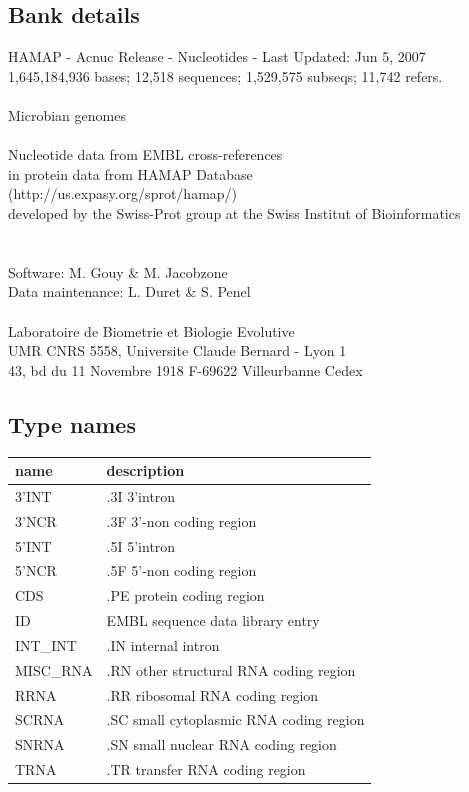 \documentclass{article}
\begin{document}
\begin{Schunk}
\subsection{Bank details}
HAMAP - Acnuc Release - Nucleotides - Last Updated: Jun  5, 2007\\
1,645,184,936 bases; 12,518 sequences; 1,529,575 subseqs; 11,742 refers.\\
\\
Microbian genomes\\
\\
Nucleotide data from  EMBL cross-references\\
in protein data from  HAMAP Database\\
(http://us.expasy.org/sprot/hamap/)\\
developed by the Swiss-Prot group at the Swiss Institut of Bioinformatics\\
\\
\\
Software: M. Gouy \& M. Jacobzone\\
Data maintenance: L. Duret \& S. Penel\\
\\
Laboratoire de Biometrie et Biologie Evolutive\\
UMR CNRS 5558, Universite Claude Bernard - Lyon 1\\
43, bd du 11 Novembre 1918 F-69622 Villeurbanne Cedex\\


\subsection{Type names}
\noindent\begin{tabular}{ll}
\hline \hline
name & description\\
\hline
3'INT & .3I 3'intron \\
3'NCR & .3F  3'-non coding region \\
5'INT & .5I 5'intron \\
5'NCR & .5F  5'-non coding region \\
CDS & .PE protein coding region \\
ID & EMBL sequence data library entry \\
INT\_INT & .IN  internal intron \\
MISC\_RNA & .RN other structural RNA coding region \\
RRNA & .RR ribosomal RNA coding region \\
SCRNA & .SC small cytoplasmic RNA coding region \\
SNRNA & .SN small nuclear RNA coding region \\
TRNA & .TR transfer RNA coding region \\
\hline \hline
\end{tabular}


\end{Schunk}
\end{document}

